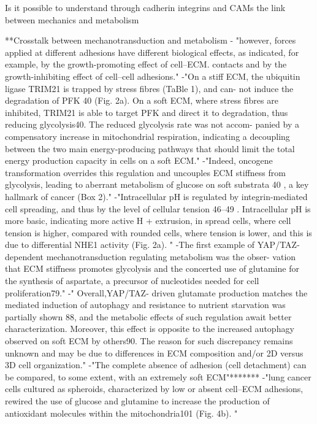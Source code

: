 \documentclass[11pt,a4paper]{article}
\begin{document}
Is it possible to understand through cadherin integrins and CAMs the link between mechanics and metabolism

**Crosstalk between mechanotransduction and metabolism
- "however, forces applied at different adhesions have different biological effects, as indicated, for
example, by the growth-promoting effect of cell–ECM. contacts and by the growth-inhibiting effect of cell–cell
adhesions."
-"On a stiff ECM, the ubiquitin ligase TRIM21 is trapped by stress fibres (TaBle 1), and can-
not induce the degradation of PFK 40 (Fig. 2a). On a soft  ECM, where stress fibres are inhibited, TRIM21 is able
to target PFK and direct it to degradation, thus reducing glycolysis40. The reduced glycolysis rate was not accom-
panied by a compensatory increase in mitochondrial respiration, indicating a decoupling between the two main energy-producing pathways that should limit the total energy production capacity in cells on a soft ECM."
-"Indeed, oncogene transformation overrides this regulation and uncouples ECM stiffness from glycolysis, leading to aberrant metabolism of glucose on soft substrata 40 , a key hallmark of cancer (Box 2)."
-"Intracellular pH is regulated by integrin-mediated cell spreading, and thus by the level
of cellular tension 46–49 . Intracellular pH is more basic, indicating more active H + extrusion, in spread cells,
where cell tension is higher, compared with rounded cells, where tension is lower, and this is due to differential NHE1 activity (Fig. 2a). "
-The first example of YAP/TAZ- dependent mechanotransduction regulating metabolism was the obser-
vation that ECM stiffness promotes glycolysis and the concerted use of glutamine for the synthesis of aspartate,
a precursor of nucleotides needed for cell proliferation79."
-" Overall,YAP/TAZ- driven glutamate production matches the mediated induction of autophagy and resistance to
nutrient starvation was partially shown 88, and the metabolic effects of such regulation await better characterization. Moreover, this effect is opposite to the increased autophagy observed on soft ECM by others90. The reason for such discrepancy remains unknown and may be due to differences in ECM composition and/or 2D versus
3D cell organization."
-"The complete absence of adhesion (cell detachment) can be compared, to some extent, with an extremely soft ECM"*******
-"lung cancer cells cultured as spheroids, characterized by low or absent cell–ECM adhesions, rewired the use of glucose and glutamine to increase the production of antioxidant molecules within the mitochondria101 (Fig. 4b). "
\end{document}
